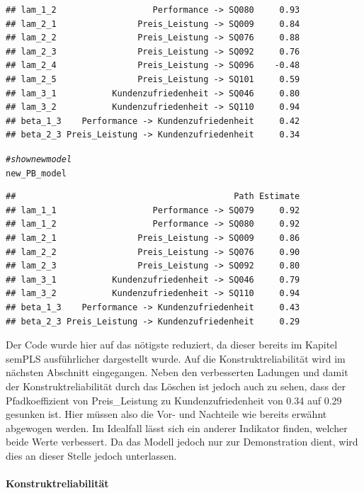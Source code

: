 \documentclass{article}\usepackage[]{graphicx}\usepackage[]{color}
\makeatletter
\newcommand{\hlcom}[1]{\textcolor[rgb]{0.678,0.584,0.686}{\textit{#1}}}%
\newcommand{\hlstd}[1]{\textcolor[rgb]{0.345,0.345,0.345}{#1}}%
\newenvironment{kframe}{%
 \def\at@end@of@kframe{}%
 \ifinner\ifhmode%
  \def\at@end@of@kframe{\end{minipage}}%
  \begin{minipage}{\columnwidth}%
 \fi\fi%
 \def\FrameCommand##1{\hskip\@totalleftmargin \hskip-\fboxsep
 \colorbox{shadecolor}{##1}\hskip-\fboxsep
     \hskip-\linewidth \hskip-\@totalleftmargin \hskip\columnwidth}%
 \MakeFramed {\advance\hsize-\width
   \@totalleftmargin\z@ \linewidth\hsize
   \@setminipage}}%
 {\par\unskip\endMakeFramed%
 \at@end@of@kframe}
\newenvironment{knitrout}{}{} %
\makeatother
\begin{document}
\begin{knitrout}
\begin{kframe}
\begin{verbatim}
## lam_1_2                   Performance -> SQ080     0.93
## lam_2_1                Preis_Leistung -> SQ009     0.84
## lam_2_2                Preis_Leistung -> SQ076     0.88
## lam_2_3                Preis_Leistung -> SQ092     0.76
## lam_2_4                Preis_Leistung -> SQ096    -0.48
## lam_2_5                Preis_Leistung -> SQ101     0.59
## lam_3_1           Kundenzufriedenheit -> SQ046     0.80
## lam_3_2           Kundenzufriedenheit -> SQ110     0.94
## beta_1_3    Performance -> Kundenzufriedenheit     0.42
## beta_2_3 Preis_Leistung -> Kundenzufriedenheit     0.34
\end{verbatim}
\begin{alltt}
\hlcom{#show new model}
\hlstd{new_PB_model}
\end{alltt}
\begin{verbatim}
##                                           Path Estimate
## lam_1_1                   Performance -> SQ079     0.92
## lam_1_2                   Performance -> SQ080     0.92
## lam_2_1                Preis_Leistung -> SQ009     0.86
## lam_2_2                Preis_Leistung -> SQ076     0.90
## lam_2_3                Preis_Leistung -> SQ092     0.80
## lam_3_1           Kundenzufriedenheit -> SQ046     0.79
## lam_3_2           Kundenzufriedenheit -> SQ110     0.94
## beta_1_3    Performance -> Kundenzufriedenheit     0.43
## beta_2_3 Preis_Leistung -> Kundenzufriedenheit     0.29
\end{verbatim}
\end{kframe}
\end{knitrout}
Der Code wurde hier auf das nötigste reduziert, da dieser bereits im Kapitel semPLS ausführlicher dargestellt wurde. Auf die Konstruktreliabilität wird im nächsten Abschnitt eingegangen. Neben den verbesserten Ladungen und damit der Konstruktreliabilität durch das Löschen ist jedoch auch zu sehen, dass der Pfadkoeffizient von Preis\_Leistung zu Kundenzufriedenheit von 0.34 auf 0.29 gesunken ist. Hier müssen also die Vor- und Nachteile wie bereits erwähnt abgewogen werden. Im Idealfall lässt sich ein anderer Indikator finden, welcher beide Werte verbessert. Da das Modell jedoch nur zur Demonstration dient, wird dies an dieser Stelle jedoch unterlassen.

\paragraph{Konstruktreliabilität} 
\end{document}

